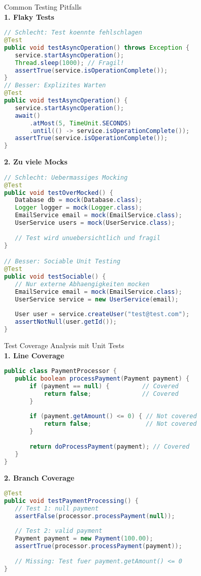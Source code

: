 \begin{example2}{Common Testing Pitfalls}\\
\textbf{1. Flaky Tests}
\begin{lstlisting}[language=Java, style=basesmol]
// Schlecht: Test koennte fehlschlagen
@Test
public void testAsyncOperation() throws Exception {
   service.startAsyncOperation();
   Thread.sleep(1000); // Fragil!
   assertTrue(service.isOperationComplete());
}
// Besser: Explizites Warten
@Test
public void testAsyncOperation() {
   service.startAsyncOperation();
   await()
       .atMost(5, TimeUnit.SECONDS)
       .until(() -> service.isOperationComplete());
   assertTrue(service.isOperationComplete());
}
\end{lstlisting}

\textbf{2. Zu viele Mocks}
\begin{lstlisting}[language=Java, style=basesmol]
// Schlecht: Uebermassiges Mocking
@Test
public void testOverMocked() {
   Database db = mock(Database.class);
   Logger logger = mock(Logger.class);
   EmailService email = mock(EmailService.class);
   UserService users = mock(UserService.class);
   
   // Test wird unuebersichtlich und fragil
}

// Besser: Sociable Unit Testing
@Test
public void testSociable() {
   // Nur externe Abhaengigkeiten mocken
   EmailService email = mock(EmailService.class);
   UserService service = new UserService(email);
   
   User user = service.createUser("test@test.com");
   assertNotNull(user.getId());
}
\end{lstlisting}
\end{example2}

\begin{example2}{Test Coverage Analysis mit Unit Tests}\\
\textbf{1. Line Coverage}
\begin{lstlisting}[language=Java, style=basesmol]
public class PaymentProcessor {
   public boolean processPayment(Payment payment) {
       if (payment == null) {         // Covered
           return false;              // Covered
       }
       
       if (payment.getAmount() <= 0) { // Not covered
           return false;               // Not covered
       }
       
       return doProcessPayment(payment); // Covered
   }
}
\end{lstlisting}

\textbf{2. Branch Coverage}
\begin{lstlisting}[language=Java, style=basesmol]
@Test
public void testPaymentProcessing() {
   // Test 1: null payment
   assertFalse(processor.processPayment(null));
   
   // Test 2: valid payment
   Payment payment = new Payment(100.00);
   assertTrue(processor.processPayment(payment));
   
   // Missing: Test fuer payment.getAmount() <= 0
}
\end{lstlisting}
\end{example2}

